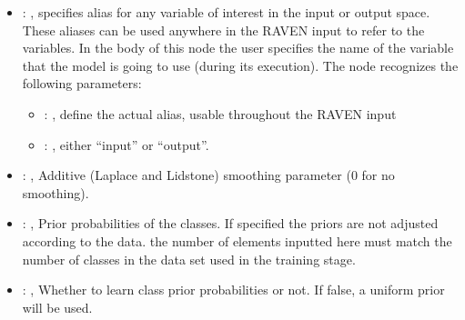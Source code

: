 \begin{itemize}
    \item {}: , 
      specifies alias for         any variable of interest in the input or output space. These
      aliases can be used anywhere in the RAVEN input to         refer to the variables. In the body
      of this node the user specifies the name of the variable that the model is going to use
      (during its execution).
      The  node recognizes the following parameters:
        \begin{itemize}
          \item {}: , 
            define the actual alias, usable throughout the RAVEN input
          \item {}: , 
            either ``input'' or ``output''.
      \end{itemize}

    \item {}: , 
      Additive (Laplace and Lidstone) smoothing parameter (0 for no smoothing).

    \item {}: , 
      Prior probabilities of the classes. If specified the priors are
      not adjusted according to the data. \nb the number of elements inputted here must
      match the number of classes in the data set used in the training stage.

    \item {}: , 
      Whether to learn class prior probabilities or not. If false, a uniform
      prior will be used.
  \end{itemize}


